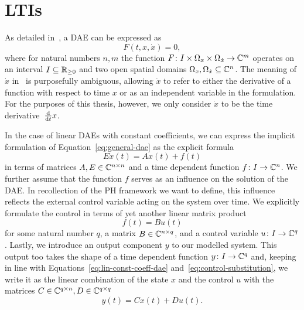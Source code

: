 \section{\aclp{LTI}}\label{sec:ltis}

As detailed in~\cite{Kunkel2006}, a \acf{DAE} can be expressed as
\begin{equation}\label{eq:general-dae}
    F(t, x, \dot{x}) = 0,
\end{equation}
where for natural numbers $n, m$ the function $F \colon I \times \Omega_x \times \Omega_{\dot{x}} \to \mathbb{C}^m$ operates on an interval $I \subseteq \mathbb{R}_{\ge 0}$ and two open spatial domains $\Omega_x, \Omega_{\dot{x}} \subseteq \mathbb{C}^n$.
The meaning of $\dot{x}$ in~\cite{Kunkel2006} is purposefully ambiguous, allowing $\dot{x}$ to refer to either the derivative of a function with respect to time $x$ or as an independent variable in the formulation.
For the purposes of this thesis, however, we only consider $\dot{x}$ to be the time derivative~$\frac{\mathop{}\!\mathrm{d}}{\mathop{}\!\mathrm{d} t} x$.

In the case of linear \acp{DAE} with constant coefficients, we can express the implicit formulation of Equation~\eqref{eq:general-dae} as the explicit formula
\begin{equation}\label{eq:lin-const-coeff-dae}
    E \dot{x}(t) = A x(t) + f(t)
\end{equation}
in terms of matrices $A, E \in \mathbb{C}^{n \times n}$ and a time dependent function $f \colon I \to \mathbb{C}^n$.
We further assume that the function $f$ serves as an influence on the solution of the \ac{DAE}.
In recollection of the \ac{PH} framework we want to define, this influence reflects the external control variable acting on the system over time.
We explicitly formulate the control in terms of yet another linear matrix product
\begin{equation}\label{eq:control-substitution}
    f(t) = B u(t)
\end{equation}
for some natural number $q$, a matrix $B \in \mathbb{C}^{n \times q}$, and a control variable $u \colon I \to \mathbb{C}^q$.
Lastly, we introduce an output component $y$ to our modelled system.
This output too takes the shape of a time dependent function $y \colon I \to \mathbb{C}^q$ and, keeping in line with Equations~\eqref{eq:lin-const-coeff-dae} and~\eqref{eq:control-substitution}, we write it as the linear combination of the state $x$ and the control $u$ with the matrices $C \in \mathbb{C}^{q \times n}, D \in \mathbb{C}^{q \times q}$
\begin{equation}\label{eq:output-definition}
    y(t) = C x(t) + D u(t).
\end{equation}

